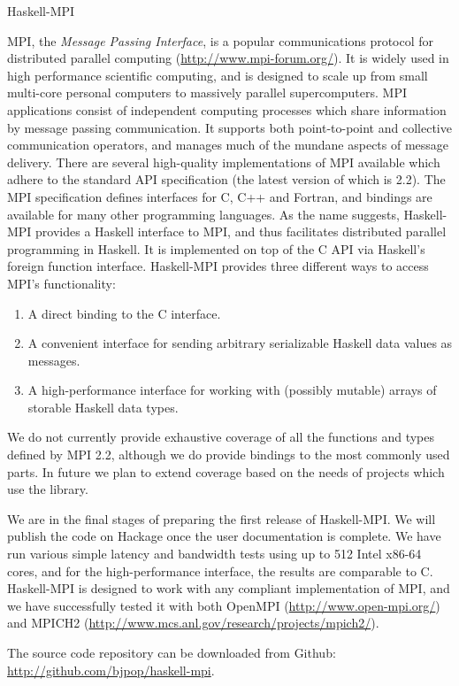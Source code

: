 \documentclass{scrreprt}
\begin{document}
\begin{hcarentry}{Haskell-MPI}
\makeheader

MPI, the \emph{Message Passing Interface}, is a popular communications protocol
for distributed parallel computing (\url{http://www.mpi-forum.org/}). It is widely
used in high performance scientific computing, and is designed to scale up from
small multi-core personal computers to massively parallel supercomputers.
MPI applications
consist of independent computing processes which share information by message passing
communication. It supports both point-to-point and collective communication operators,
and manages much of the mundane aspects of message delivery. There are several
high-quality implementations of MPI available which adhere to the standard API
specification (the latest version of which is 2.2). The MPI specification defines
interfaces for C, C++ and Fortran, and bindings are available for many other
programming languages. As the name suggests, Haskell-MPI provides a Haskell interface
to MPI, and thus facilitates distributed parallel programming in Haskell. It is implemented
on top of the C API via Haskell's foreign function interface. Haskell-MPI provides
three different ways to access MPI's functionality:
\begin{enumerate}
   \item A direct binding to the C interface.
   \item A convenient interface for sending arbitrary serializable Haskell data values as messages.
   \item A high-performance interface for working with (possibly mutable) arrays of storable
         Haskell data types.
\end{enumerate}
We do not currently provide exhaustive coverage of all the functions and types defined by MPI
2.2, although we do provide bindings to the most commonly used parts. In future we plan
to extend coverage based on the needs of projects which use the library.

We are in the final stages of preparing the first release of Haskell-MPI. We will
publish the code on Hackage once the user documentation is complete.
We have run various simple latency and bandwidth tests using up to 512 Intel x86-64 cores, and
for the high-performance interface, the results are comparable to C.
Haskell-MPI is designed to work with any compliant implementation of MPI, and we
have successfully tested it with both OpenMPI (\url{http://www.open-mpi.org/}) and
MPICH2 (\url{http://www.mcs.anl.gov/research/projects/mpich2/}).

The source code repository can be downloaded from Github:
  \url{http://github.com/bjpop/haskell-mpi}.

\end{hcarentry}
\end{document}
